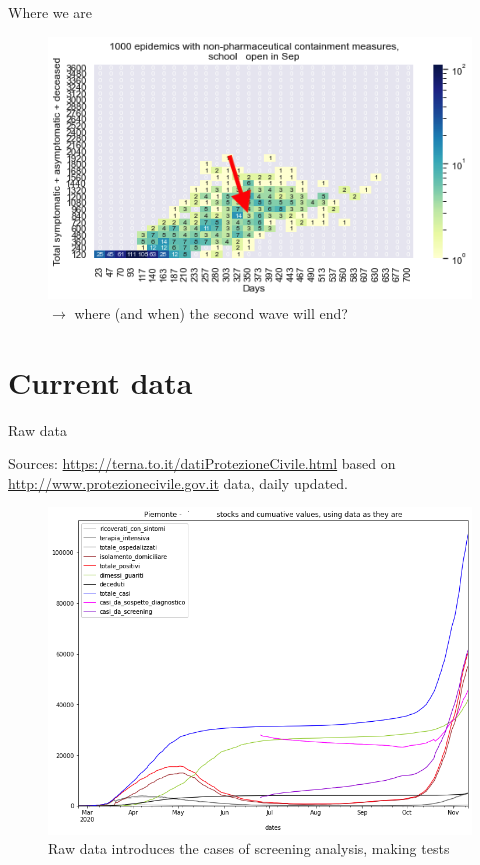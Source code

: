 \documentclass[8pt]{beamer}
\begin{document}
\begin{frame}{Where we are}

\begin{figure}[H]
\center
\includegraphics[scale=0.55]{WhereWeAre.png}

\caption{$\rightarrow$ where (and when) the second wave will end?} 
\label{WhereWeAre}
\end{figure}

\end{frame}

\section{Current data}

\begin{frame}{Raw data}

Sources: \url{https://terna.to.it/datiProtezioneCivile.html}  based on \url{http://www.protezionecivile.gov.it} data, daily updated.

\begin{figure}[H]
\center
\includegraphics[scale=0.26]{rawCurrent.png}

\caption{Raw data introduces the cases of screening analysis, making tests} 
\label{rawCurrent}
\end{figure}

\end{frame}
\end{document}
